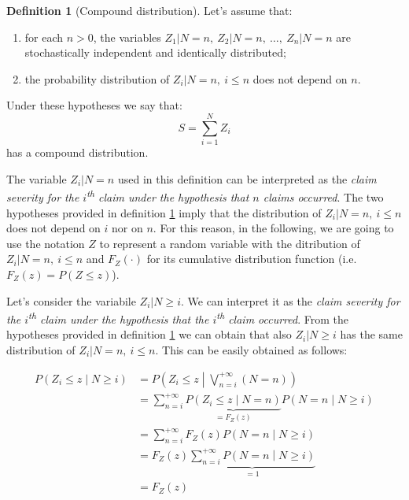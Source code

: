 \documentclass[a4paper, nobind]{templates/ociamthesis}
\providecommand{\tightlist}{%
  \setlength{\itemsep}{0pt}\setlength{\parskip}{0pt}}
\theoremstyle{definition}
\newtheorem{definition}{Definition}[chapter]
\theoremstyle{definition}
\theoremstyle{definition}
\theoremstyle{remark}
\begin{document}
\begin{definition}[Compound distribution]
\label{def:comp-dist} \iffalse (Compound distribution) \fi{}
Let's assume that:

\begin{enumerate}
\def\labelenumi{\arabic{enumi}.}
\tightlist
\item
  for each \(n>0\), the variables \(Z_1|N=n,\ Z_2|N=n,\ \dots,\ Z_n|N=n\) are stochastically independent and identically distributed;
\item
  the probability distribution of \(Z_i|N=n, \ i\le n\) does not depend on \(n\).
\end{enumerate}

Under these hypotheses we say that:
\[
S = \sum_{i=1}^{N}{Z_i}
\]
has a compound distribution.
\end{definition}

The variable \(Z_i|N=n\) used in this definition can be interpreted as the \emph{claim severity for the \(i\)\textsuperscript{th} claim under the hypothesis that \(n\) claims occurred}. The two hypotheses provided in definition \ref{def:comp-dist} imply that the distribution of \(Z_i|N=n, \ i\le n\) does not depend on \(i\) nor on \(n\). For this reason, in the following, we are going to use the notation \(Z\) to represent a random variable with the ditribution of \(Z_i|N=n, \ i\le n\) and \(F_Z(\cdot)\) for its cumulative distribution function (i.e.~\(F_Z(z) = P(Z\le z)\)).

Let's consider the variabile \(Z_i|N\ge i\). We can interpret it as the \emph{claim severity for the \(i\)\textsuperscript{th} claim under the hypothesis that the \(i\)\textsuperscript{th} claim occurred}. From the hypotheses provided in definition \ref{def:comp-dist} we can obtain that also \(Z_i|N\ge i\) has the same distribution of \(Z_i|N=n, \ i\le n\). This can be easily obtained as follows:

\begin{align}
\label{eq:z1}
P\left(Z_i \le z \middle| N\ge i \right) & = P\left(Z_i \le z \middle| \bigvee_{n = i}^{+\infty}{(N=n)}\right)
\\ \label{eq:z2} & =
\sum_{n=i}^{+\infty}{ \underbrace{P\left(Z_i\le z \middle| N=n\right)}_{=F_Z(z)} P\left( N = n \middle| N\ge i \right)}
\\ \label{eq:z3} & =
\sum_{n=i}^{+\infty}{ F_Z(z) P\left( N = n \middle| N\ge i \right)}
\\ \label{eq:z4} & =
F_Z(z) \underbrace{\sum_{n=i}^{+\infty}{P\left( N = n \middle| N\ge i \right)}}_{=1}
\\ \nonumber & =
F_Z(z)
\end{align}
\end{document}
